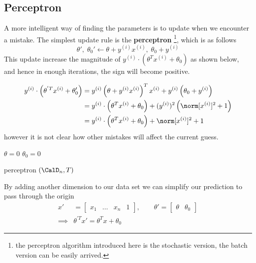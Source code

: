 \subsection{Perceptron}
A more intelligent way of finding the parameters is to update when we encounter a mistake. The simplest update rule is the \textbf{perceptron} \footnote{the perceptron algorithm introduced here is the stochastic version, the batch version can be easily arrived.}, which is as follows
\begin{equation*}
    \theta' ,\; \theta_0' \gets \theta + y^{(i)}x^{(i)} ,\; \theta_0 + y^{(i)}
\end{equation*}
This update increase the magnitude of \(y^{(i)}\cdot(\theta^T x^{(i)} + \theta_0)\) as shown below, and hence in enough iterations, the sign will become positive.

\begin{align*}
    y^{(i)}\cdot  \left( \theta^{'T} x^{(i)} + \theta'_0 \right) &= y^{(i)} \left( \theta + y^{(i)} x^{(i)} \right)^T x^{(i)} + y^{(i)} \left( \theta_0 + y^{(i)} \right)\\
    &= y^{(i)} \cdot \left( \theta^T x^{(i)} + \theta_0 \right) + (y^{(i)})^2 \left( \norm[x^{(i)}]^2 + 1 \right)\\
    &=  y^{(i)} \cdot\left( \theta^T x^{(i)} + \theta_0 \right)+ \norm[x^{(i)}]^2 + 1
\end{align*}
however it is not clear how other mistakes will affect the current guess.

\begin{algorithm}[H] \label{algo:perceptron}
    \DontPrintSemicolon
    $\theta = 0 $\;
    $\theta_0 = 0 $\;

    \caption{ perceptron $(\CalD_n , T )$}
\end{algorithm}


By adding another dimension to our data set we can simplify our prediction to pass through the origin
\begin{align*}
    x'       & = \begin{bmatrix}
        x_1 & \dots & x_n & 1
    \end{bmatrix}, \qquad \theta' = \begin{bmatrix}
        \theta & \theta_0
    \end{bmatrix} \\
    \implies & \theta^{'T} x' = \theta^T x + \theta_0
\end{align*}

